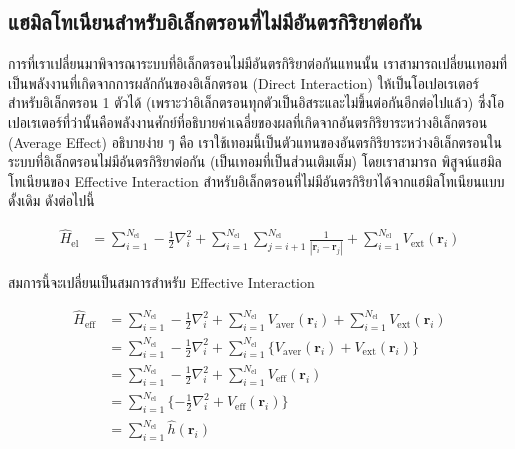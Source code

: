 \subsection{แฮมิลโทเนียนสำหรับอิเล็กตรอนที่ไม่มีอันตรกิริยาต่อกัน}
\label{ssec:hamil_noninter_elec}

การที่เราเปลี่ยนมาพิจารณาระบบที่อิเล็กตรอนไม่มีอันตรกิริยาต่อกันแทนนั้น เราสามารถเปลี่ยนเทอมที่เป็นพลังงานที่เกิดจากการผลักกันของอิเล็กตรอน 
(Direct Interaction) ให้เป็นโอเปอเรเตอร์สำหรับอิเล็กตรอน 1 ตัวได้ (เพราะว่าอิเล็กตรอนทุกตัวเป็นอิสระและไม่ขึ้นต่อกันอีกต่อไปแล้ว) 
ซึ่งโอเปอเรเตอร์ที่ว่านั้นคือพลังงานศักย์ที่อธิบายค่าเฉลี่ยของผลที่เกิดจากอันตรกิริยาระหว่างอิเล็กตรอน (Average Effect) อธิบายง่าย ๆ คือ%
เราใช้เทอมนี้เป็นตัวแทนของอันตรกิริยาระหว่างอิเล็กตรอนในระบบที่อิเล็กตรอนไม่มีอันตรกิริยาต่อกัน (เป็นเทอมที่เป็นส่วนเติมเต็ม) โดยเราสามารถ%
พิสูจน์แฮมิลโทเนียนของ Effective Interaction สำหรับอิเล็กตรอนที่ไม่มีอันตรกิริยาได้จากแฮมิลโทเนียนแบบดั้งเดิม ดังต่อไปนี้

\begin{align}\label{eq:hamil_inter_elec}
    \hat{H}_{\text{el}} &= \sum^{N_{\text{el}}}_{i=1} -\frac{1}{2} \nabla^{2}_{i} 
    + \sum^{N_{\text{el}}}_{i=1} \sum^{N_{\text{el}}}_{j=i+1} \frac{1}{|\bm{r}_{i}-\bm{r}_{j}|}
    + \sum^{N_{\text{el}}}_{i=1} V_{\text{ext}}(\bm{r}_{i})
\end{align}

\noindent สมการนี้จะเปลี่ยนเป็นสมการสำหรับ Effective Interaction

\begin{align}\label{eq:hamil_noninter_eff_full}
    \hat{H}_{\text{eff}} &= \sum^{N_{\text{el}}}_{i=1} -\frac{1}{2} \nabla^{2}_{i} 
    + \sum^{N_{\text{el}}}_{i=1} V_{\text{aver}}(\bm{r}_{i})
    + \sum^{N_{\text{el}}}_{i=1} V_{\text{ext}}(\bm{r}_{i}) \nonumber \\
    &= \sum^{N_{\text{el}}}_{i=1} -\frac{1}{2} \nabla^{2}_{i} 
    + \sum^{N_{\text{el}}}_{i=1} \{ V_{\text{aver}}(\bm{r}_{i}) + V_{\text{ext}}(\bm{r}_{i}) \} \nonumber \\
    &= \sum^{N_{\text{el}}}_{i=1} -\frac{1}{2} \nabla^{2}_{i} 
    + \sum^{N_{\text{el}}}_{i=1} V_{\text{eff}}(\bm{r}_{i}) \nonumber \\
    &= \sum^{N_{\text{el}}}_{i=1} \{ -\frac{1}{2} \nabla^{2}_{i} + V_{\text{eff}}(\bm{r}_{i}) \} \nonumber \\
    &= \sum^{N_{\text{el}}}_{i=1} \hat{h}(\bm{r}_{i})
\end{align}

